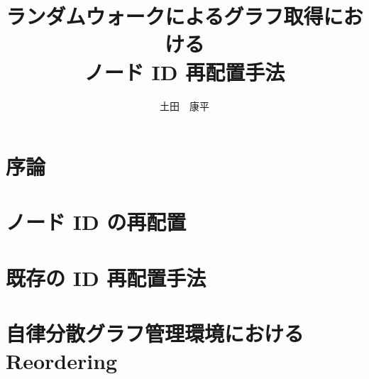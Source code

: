 \documentclass[12pt]{b-thesis}
\begin{document}
\title{ランダムウォークによるグラフ取得における\\ノード ID 再配置手法}
\titleinenglish{}
\subteacher{}
\courseinenglish{}
\author{土田　康平}
\maketitle

\courseinenglish{}
\authorinenglish{}
\titleinenglish{}



\makejabstract

\clearpage


\setcounter{page}{1}

\tableofcontents
\thispagestyle{plain}

\listoffigures
\listoftables

\clearpage


\pagestyle{headings}
\setcounter{page}{1}

\clearpage

\chapter{序論}
\label{chap:introduction}


\chapter{ノード ID の再配置}
\label{chap:existing_technology}


\chapter{既存の ID 再配置手法}
\label{chap:related_research}


\chapter{自律分散グラフ管理環境における Reordering}
\label{chap:design}

\end{document}
